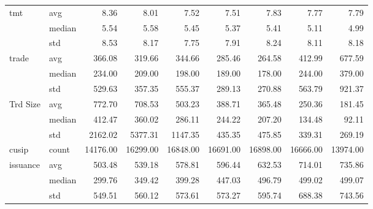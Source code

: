 \begin{tabular}{llrrrrrrr}
\cline{1-9}
\multirow[t]{3}{*}{tmt} & avg & 8.36 & 8.01 & 7.52 & 7.51 & 7.83 & 7.77 & 7.79 \\
 & median & 5.54 & 5.58 & 5.45 & 5.37 & 5.41 & 5.11 & 4.99 \\
 & std & 8.53 & 8.17 & 7.75 & 7.91 & 8.24 & 8.11 & 8.18 \\
\cline{1-9}
\multirow[t]{3}{*}{trade} & avg & 366.08 & 319.66 & 344.66 & 285.46 & 264.58 & 412.99 & 677.59 \\
 & median & 234.00 & 209.00 & 198.00 & 189.00 & 178.00 & 244.00 & 379.00 \\
 & std & 529.63 & 357.35 & 555.37 & 289.13 & 270.88 & 563.79 & 921.37 \\
\cline{1-9}
\multirow[t]{3}{*}{Trd Size} & avg & 772.70 & 708.53 & 503.23 & 388.71 & 365.48 & 250.36 & 181.45 \\
 & median & 412.47 & 360.02 & 286.11 & 244.22 & 207.20 & 134.48 & 92.11 \\
 & std & 2162.02 & 5377.31 & 1147.35 & 435.35 & 475.85 & 339.31 & 269.19 \\
\cline{1-9}
cusip & count & 14176.00 & 16299.00 & 16848.00 & 16691.00 & 16898.00 & 16666.00 & 13974.00 \\
\cline{1-9}
\multirow[t]{3}{*}{issuance} & avg & 503.48 & 539.18 & 578.81 & 596.44 & 632.53 & 714.01 & 735.86 \\
 & median & 299.76 & 349.42 & 399.28 & 447.03 & 496.79 & 499.02 & 499.07 \\
 & std & 549.51 & 560.12 & 573.61 & 573.27 & 595.74 & 688.38 & 743.56 \\
\cline{1-9}
\bottomrule
\end{tabular}
